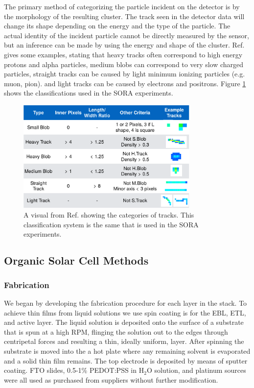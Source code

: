 The primary method of categorizing the particle incident on the detector is by the morphology of the resulting cluster.
The track seen in the detector data will change its shape depending on the energy and the type of the particle.
The actual identity of the incident particle cannot be directly measured by the sensor, but an inference can be made by using the energy and shape of the cluster. Ref. \cite{Stuart-Thesis} gives some examples, stating that heavy tracks often correspond to high energy protons and alpha particles, medium blobs can correspond to very slow charged particles, straight tracks can be caused by light minimum ionizing particles (e.g. muon, pion). and light tracks can be caused by electrons and positrons.     
Figure \ref{fig:stuart-track-types} shows the classifications used in the SORA experiments.
\begin{figure}[h!]
	\begin{center}
		\includegraphics[width=0.8\textwidth]{figures/stuart-track-types.pdf}
		\caption{A visual from Ref. \cite{Stuart-Thesis} showing the categories of tracks. This classification system is the same that is used in the SORA experiments.}
		\label{fig:stuart-track-types}
	\end{center}
\end{figure}

\subsection{Organic Solar Cell Methods}
\label{sec:Solar-Cell-Methods}


\subsubsection{Fabrication}

We began by developing the fabrication procedure for each layer in the stack. To achieve thin films from liquid solutions we use spin coating is for the EBL, ETL, and active layer. The liquid solution is deposited onto the surface of a substrate that is spun at a high RPM, flinging the solution out to the edges through centripetal forces and resulting a thin, ideally uniform, layer. After spinning the substrate is moved into the a hot plate where any remaining solvent is evaporated and a solid thin film remains. The top electrode is deposited by means of sputter coating. FTO slides, 0.5-1\% PEDOT:PSS in H$_2$O solution, and platinum sources were all used as purchased from suppliers without further modification. \\
	
